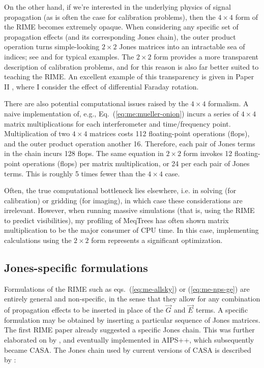 \documentclass{aa}
\newcommand{\jones}[2]{\vec {#1}_{#2}}
\begin{document}
On the other hand, if we're interested in the underlying physics of signal propagation (as is often the case for calibration problems), then the $4\times4$ form of the RIME becomes extremely opaque. When considering any specific set of propagation effects (and its corresponding Jones chain), the outer product operation turns simple-looking $2\times2$ Jones matrices into an intractable sea of indices; see \citet[Eq. 4]{SB:imageplane} and \citet[Appendix A]{ME1} for typical examples. The $2\times2$ form provides a more transparent description of calibration problems, and for this reason is also far better suited to teaching the RIME. An excellent example of this transparency is given in Paper II \citep[Sect.~2.2.2]{RRIME2}, where I consider the effect of differential Faraday rotation.

There are also potential computational issues raised by the $4\times4$ formalism. A naive implementation of, e.g., Eq.~(\ref{eq:me:mueller-onion}) incurs a series of $4\times4$ matrix multiplications for each interferometer and time/frequency point. Multiplication of two $4\times4$ matrices costs 112 floating-point operations (flops), and the outer product operation another 16. Therefore, each pair of Jones terms in the chain incurs 128 flops. The same equation in $2\times2$ form invokes 12 floating-point operations (flops) per matrix multiplication, or 24 per each pair of Jones terms. This is roughly 5 times fewer than the $4\times4$ case. 

Often, the true computational bottleneck lies elsewhere, i.e. in solving (for calibration) or gridding (for imaging), in which case these considerations are irrelevant. However, when running massive simulations (that is, using the RIME to predict visibilities), my profiling of MeqTrees has often shown matrix multiplication to be the major consumer of CPU time. In this case, implementing calculations using the $2\times2$ form represents a significant optimization.

\subsection{Jones-specific formulations\label{sec:jones-specific}} 

Formulations of the RIME such as eqs.~(\ref{eq:me-allsky}) or (\ref{eq:me-nps-ge}) are entirely general and non-specific, in the sense that they allow for any combination of propagation effects to be inserted in place of the $\jones{G}{}$ and $\jones{E}{}$ terms. A specific formulation may be obtained by inserting a particular sequence of Jones matrices. The first RIME paper \citep{ME1} already suggested a specific Jones chain. This was further elaborated on by \citet{JEN:note185}, and eventually implemented in AIPS++, which subsequently became CASA. The Jones chain used by current versions of CASA is described by \citet[Appendix E.1]{CASA:UserRef}:
\end{document}
